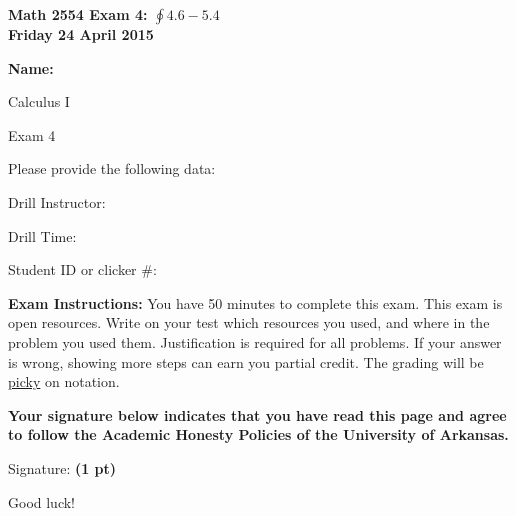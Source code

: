 \documentclass[12pt,letterpaper]{article}
\begin{document}
\flushleft
\begin{multicols}{2}
\textbf{Math 2554 Exam 4: $\oint 4.6-5.4$ \\
Friday 24 April 2015}

\textbf{Name:  }\underline{\hspace{45ex}} %

\vspace{.5in}

\end{multicols}

\pagestyle{empty}

\flushleft

\begin{center}\LARGE Calculus I 

Exam 4 \end{center}

\vspace{1.75pc}
Please provide the following data:

\vspace{1.75pc}
Drill Instructor: \underline{\hspace{40ex}}

\vspace{1.75pc}
Drill Time: \underline{\hspace{40ex}}

\vspace{1.75pc}
Student ID or clicker \#: \underline{\hspace{40ex}}

\vspace{3pc}
{\bf Exam Instructions:} You have 50 minutes to complete this exam.  This exam is open resources.  Write on your test which resources you used, and where in the problem you used them.  Justification is required for all problems.  If your answer is wrong, showing more steps can earn you partial credit.  The grading will be \underline{picky} on notation.

\vfill
\textbf{Your signature below indicates that you have read this page and agree to follow the Academic Honesty Policies of the University of Arkansas.}  

\vspace{5pc}
Signature: {\bf (1 pt)} \underline{\hspace{91ex}}

\begin{flushright}\Large Good luck!\end{flushright}
\end{document}
